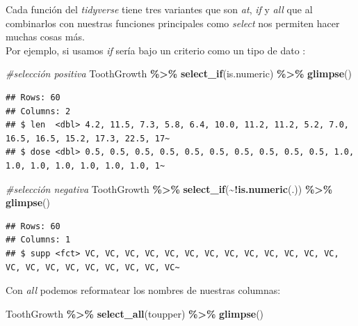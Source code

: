 \documentclass[
]{book}
\newenvironment{Shaded}{\begin{snugshade}}{\end{snugshade}}
\newcommand{\CommentTok}[1]{\textcolor[rgb]{0.56,0.35,0.01}{\textit{#1}}}
\newcommand{\FunctionTok}[1]{\textcolor[rgb]{0.13,0.29,0.53}{\textbf{#1}}}
\newcommand{\NormalTok}[1]{#1}
\newcommand{\SpecialCharTok}[1]{\textcolor[rgb]{0.81,0.36,0.00}{\textbf{#1}}}
\begin{document}
\hfill\break
Cada función del \emph{tidyverse} tiene tres variantes que son \emph{at}, \emph{if} y \emph{all} que al combinarlos con nuestras funciones principales como \emph{select} nos permiten hacer muchas cosas más.\\
Por ejemplo, si usamos \emph{if} sería bajo un criterio como un tipo de dato
:\\

\begin{Shaded}
\begin{Highlighting}[]
\CommentTok{\#selección positiva}
\NormalTok{ToothGrowth }\SpecialCharTok{\%\textgreater{}\%} \FunctionTok{select\_if}\NormalTok{(is.numeric) }\SpecialCharTok{\%\textgreater{}\%} \FunctionTok{glimpse}\NormalTok{()}
\end{Highlighting}
\end{Shaded}

\begin{verbatim}
## Rows: 60
## Columns: 2
## $ len  <dbl> 4.2, 11.5, 7.3, 5.8, 6.4, 10.0, 11.2, 11.2, 5.2, 7.0, 16.5, 16.5, 15.2, 17.3, 22.5, 17~
## $ dose <dbl> 0.5, 0.5, 0.5, 0.5, 0.5, 0.5, 0.5, 0.5, 0.5, 0.5, 1.0, 1.0, 1.0, 1.0, 1.0, 1.0, 1.0, 1~
\end{verbatim}

\begin{Shaded}
\begin{Highlighting}[]
\CommentTok{\#selección negativa}
\NormalTok{ToothGrowth }\SpecialCharTok{\%\textgreater{}\%} \FunctionTok{select\_if}\NormalTok{(}\SpecialCharTok{\textasciitilde{}!}\FunctionTok{is.numeric}\NormalTok{(.)) }\SpecialCharTok{\%\textgreater{}\%} \FunctionTok{glimpse}\NormalTok{()}
\end{Highlighting}
\end{Shaded}

\begin{verbatim}
## Rows: 60
## Columns: 1
## $ supp <fct> VC, VC, VC, VC, VC, VC, VC, VC, VC, VC, VC, VC, VC, VC, VC, VC, VC, VC, VC, VC, VC, VC~
\end{verbatim}

\hfill\break
Con \emph{all} podemos reformatear los nombres de nuestras columnas:

\begin{Shaded}
\begin{Highlighting}[]
\NormalTok{ToothGrowth }\SpecialCharTok{\%\textgreater{}\%} \FunctionTok{select\_all}\NormalTok{(toupper) }\SpecialCharTok{\%\textgreater{}\%} \FunctionTok{glimpse}\NormalTok{()}
\end{Highlighting}
\end{Shaded}
\end{document}
